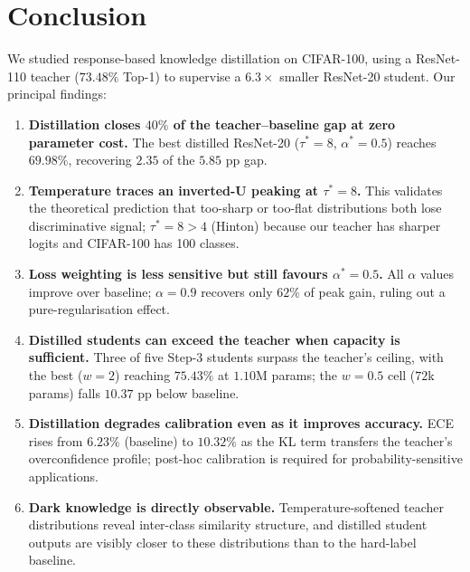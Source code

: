 \documentclass{article}
\theoremstyle{plain}
\theoremstyle{definition}
\theoremstyle{remark}
\begin{document}
\section{Conclusion}
\label{sec:conclusion}

We studied response-based knowledge distillation \citep{hinton2015distilling} on CIFAR-100, using a ResNet-110 teacher ($73.48\%$ Top-1) to supervise a $6.3\times$ smaller ResNet-20 student. Our principal findings:

\begin{enumerate}
\item \textbf{Distillation closes $40\%$ of the teacher--baseline gap at zero parameter cost.} The best distilled ResNet-20 ($\tau^*=8$, $\alpha^*=0.5$) reaches $69.98\%$, recovering $2.35$ of the $5.85$ pp gap.

\item \textbf{Temperature traces an inverted-U peaking at $\tau^*=8$.} This validates the theoretical prediction that too-sharp or too-flat distributions both lose discriminative signal; $\tau^*=8 > 4$ (Hinton) because our teacher has sharper logits and CIFAR-100 has 100 classes.

\item \textbf{Loss weighting is less sensitive but still favours $\alpha^*=0.5$.} All $\alpha$ values improve over baseline; $\alpha=0.9$ recovers only $62\%$ of peak gain, ruling out a pure-regularisation effect.

\item \textbf{Distilled students can exceed the teacher when capacity is sufficient.} Three of five Step-3 students surpass the teacher's ceiling, with the best ($w=2$) reaching $\mathbf{75.43\%}$ at $1.10$M params; the $w=0.5$ cell ($72$k params) falls $10.37$ pp below baseline.

\item \textbf{Distillation degrades calibration even as it improves accuracy.} ECE rises from $6.23\%$ (baseline) to $10.32\%$ as the KL term transfers the teacher's overconfidence profile; post-hoc calibration is required for probability-sensitive applications.

\item \textbf{Dark knowledge is directly observable.} Temperature-softened teacher distributions reveal inter-class similarity structure, and distilled student outputs are visibly closer to these distributions than to the hard-label baseline.
\end{enumerate}
\end{document}
